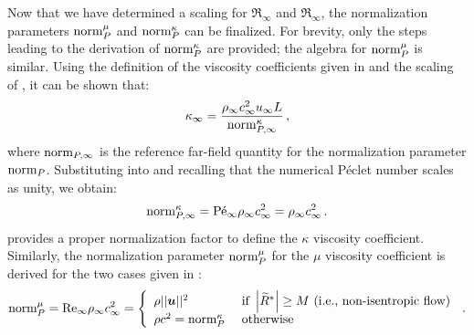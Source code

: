 Now that we have determined a scaling for $\Re_\infty$ and $\Re_\infty$, the normalization parameters $\textrm{norm}_P^\mu$ and $\textrm{norm}_P^\kappa$ can be finalized. For brevity, only the steps leading to the derivation of $\textrm{norm}_P^\kappa$ are provided; the algebra for $\textrm{norm}_P^\mu$ is similar. Using the definition of the viscosity coefficients given in  and the scaling of , it can be shown that:
%
\begin{equation}
\label{eq:norm_relation}
\kappa_\infty = \frac{ \rho_\infty c_\infty^2 u_\infty L }{ \textrm{norm}_{P,\infty}^{\kappa} } \, ,
\end{equation}
%
where $\textrm{norm}_{P,\infty}$ is the reference far-field quantity for the normalization parameter $\textrm{norm}_P$. Substituting  into  and recalling that the numerical P\'eclet number scales as unity, we obtain:
%
\begin{equation}
\label{eq:norm_relation_bis}
\textrm{norm}_{P,\infty}^{\kappa} = \textrm{P\'e}_\infty \rho_\infty c_\infty^2 = \rho_\infty c_\infty^2 \, .
\end{equation}
%
 provides a proper normalization factor to define the $\kappa$ viscosity coefficient.
Similarly, the normalization parameter $\textrm{norm}_P^\mu$ for the $\mu$ viscosity coefficient is derived for the two cases given in :
%
\begin{equation}
\label{eq:norm_ent2}
\textrm{norm}_P^\mu = \textrm{Re}_\infty \rho_\infty c_\infty^2 =  \left\{
\begin{array}{ll}
 \rho ||\boldsymbol u ||^2       & \text{ if } \left| \widetilde{R}^* \right| \geq M \text{ (i.e., non-isentropic flow)} \\
 \rho c^2 = \textrm{norm}_P^\kappa & \text{ otherwise}
\end{array}
\right. \,.
\end{equation}
%

